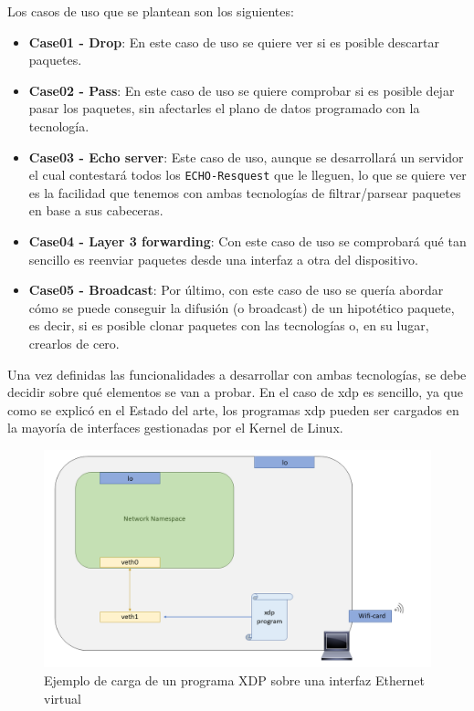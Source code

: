 Los casos de uso que se plantean son los siguientes: 

\begin{itemize}
    \item   \textbf{Case01 - Drop}: En este caso de uso se quiere ver si es posible descartar paquetes.
    \item   \textbf{Case02 - Pass}: En este caso de uso se quiere comprobar si es posible dejar pasar los paquetes, sin afectarles el plano de datos programado con la tecnología.
    \item   \textbf{Case03 - Echo server}: Este caso de uso, aunque se desarrollará un servidor el cual contestará todos los \texttt{ECHO-Resquest} que le lleguen, lo que se quiere ver es la facilidad que tenemos con ambas tecnologías de filtrar/parsear paquetes en base a sus cabeceras.
    
    \item   \textbf{Case04 - Layer 3 forwarding}: Con este caso de uso se comprobará qué tan sencillo es reenviar paquetes desde una interfaz a otra del dispositivo. 
    
    \item   \textbf{Case05 - Broadcast}: Por último, con este caso de uso se quería abordar cómo se puede conseguir  la difusión (o broadcast) de un hipotético paquete, es decir, si es posible clonar paquetes con las tecnologías o, en su lugar, crearlos de cero. 
\end{itemize}

Una vez definidas las funcionalidades a desarrollar con ambas tecnologías, se debe decidir sobre qué elementos se van a probar. En el caso de \gls{xdp} es sencillo, ya que como se explicó en el Estado del arte, los programas \gls{xdp} pueden ser cargados en la mayoría de interfaces gestionadas por el Kernel de Linux. \\
\par

\begin{figure}[ht]
    \centering
    \includegraphics[width=14cm]{archivos/img/analisis/xdp_process.png}
    \caption{Ejemplo de carga de un programa XDP sobre una interfaz Ethernet virtual}
    \label{fig:xdp_process}
\end{figure}



